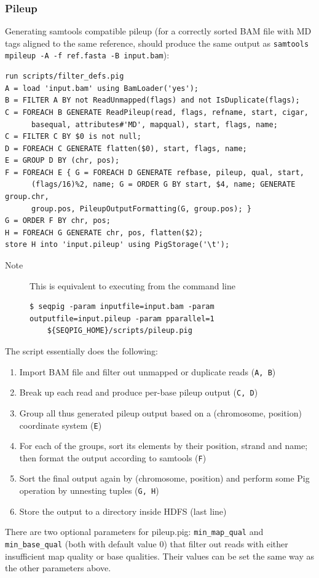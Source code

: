 {\subsubsection{Pileup}
\label{subsubsect:pileup}
Generating samtools compatible pileup (for a correctly sorted BAM file
with MD tags aligned to the same reference, should produce the same output as
{\tt samtools mpileup -A -f ref.fasta -B input.bam}):
\begin{lstlisting}
run scripts/filter_defs.pig
A = load 'input.bam' using BamLoader('yes');
B = FILTER A BY not ReadUnmapped(flags) and not IsDuplicate(flags);
C = FOREACH B GENERATE ReadPileup(read, flags, refname, start, cigar,
      basequal, attributes#'MD', mapqual), start, flags, name;
C = FILTER C BY $0 is not null;
D = FOREACH C GENERATE flatten($0), start, flags, name;
E = GROUP D BY (chr, pos);
F = FOREACH E { G = FOREACH D GENERATE refbase, pileup, qual, start,
      (flags/16)%2, name; G = ORDER G BY start, $4, name; GENERATE group.chr,
      group.pos, PileupOutputFormatting(G, group.pos); }
G = ORDER F BY chr, pos;
H = FOREACH G GENERATE chr, pos, flatten($2);
store H into 'input.pileup' using PigStorage('\t');
\end{lstlisting}
\begin{description}
	\item[Note] This is equivalent to executing from the command line
\begin{lstlisting}
$ seqpig -param inputfile=input.bam -param outputfile=input.pileup -param pparallel=1
    ${SEQPIG_HOME}/scripts/pileup.pig
\end{lstlisting}
\end{description}
The script essentially does the following:
\begin{enumerate}
\item Import BAM file and filter out unmapped or duplicate reads ({\tt A, B})
\item Break up each read and produce per-base pileup output ({\tt C, D})
\item Group all thus generated pileup output based on a (chromosome, position)
coordinate system ({\tt E})
\item For each of the groups, sort its elements by their position, strand and name;
then format the output according to samtools ({\tt F})
\item Sort the final output again by (chromosome, position) and perform
some Pig operation by unnesting tuples ({\tt G, H})
\item Store the output to a directory inside HDFS (last line)
\end{enumerate}
There are two optional parameters for pileup.pig: {\tt min\_map\_qual} and
{\tt min\_base\_qual} (both with default value 0) that filter out reads with
either insufficient map quality or base qualities. Their values can
be set the same way as the other parameters above.

}
